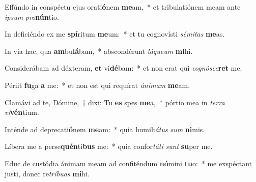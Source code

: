 \item Effúndo in conspéctu ejus orati\textbf{ó}nem \textbf{me}am,~* et tribulatiónem meam ante \textit{ip}\textit{sum} \textit{pro}\textbf{nún}tio.
\item In deficiéndo ex me \textbf{spí}ritum \textbf{me}um:~* et tu cognovísti \textit{sé}\textit{mi}\textit{tas} \textbf{me}as.
\item In via hac, qua \textbf{am}bu\textbf{lá}bam,~* abscondérunt \textit{lá}\textit{que}\textit{um} \textbf{mi}hi.
\item Considerábam ad déxteram, \textbf{et} vi\textbf{dé}bam:~* et non erat qui \textit{co}\textit{gnó}\textit{sce}\textbf{ret} me.
\item Périit \textbf{fu}ga \textbf{a} me:~* et non est qui requírat \textit{á}\textit{ni}\textit{mam} \textbf{me}am.
\item Clamávi ad te, Dómine,~† dixi: Tu \textbf{es} spes \textbf{me}a,~* pórtio mea in \textit{ter}\textit{ra} \textit{vi}\textbf{vén}tium.
\item Inténde ad deprecati\textbf{ó}nem \textbf{me}am:~* quia humili\textit{á}\textit{tus} \textit{sum} \textbf{ni}mis.
\item Líbera me a perse\textbf{quén}ti\textbf{bus} me:~* quia confor\textit{tá}\textit{ti} \textit{sunt} \textbf{su}per me.
\item Educ de custódia ánimam meam ad confiténdum \textbf{nó}mini \textbf{tu}o:~* me exspéctant justi, donec re\textit{trí}\textit{bu}\textit{as} \textbf{mi}hi.
